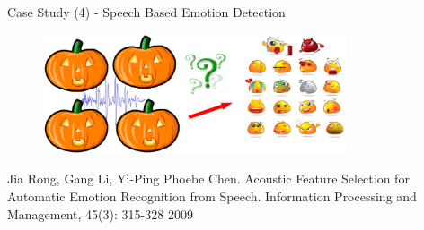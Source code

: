 \documentclass[
 size=14pt,
 paper=smartboard,  %
 mode=present, 		%
 display=slides, 	%
 style=tuliplab,  	%
 pauseslide,
 fleqn,leqno]{powerdot}
\begin{document}
\begin{slide}[toc=,bm=]{Case Study (4) - Speech Based Emotion Detection}

\begin{figure}
  \includegraphics[width=0.8\textwidth]{figures//theme1//Theme1_22.eps}
\end{figure}

\begin{thebibliography}{}
\bibitem{}
\small{Jia Rong, Gang Li, Yi-Ping Phoebe Chen.
Acoustic Feature Selection for Automatic Emotion Recognition from Speech.
Information Processing and Management, 45(3):  315-328 2009}
\end{thebibliography}

\end{slide}
\end{document}
